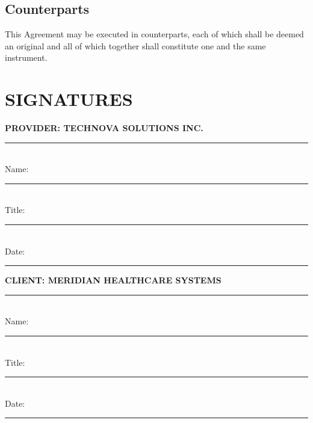 \documentclass[
    language=english,
    doctype=contract,
    institution=none,
]{../../omnilatex}
\begin{document}
\subsection{Counterparts}
This Agreement may be executed in counterparts, each of which shall be deemed an original and all of which together shall constitute one and the same instrument.

\section*{SIGNATURES}

\vspace{2cm}

\noindent\textbf{PROVIDER: TECHNOVA SOLUTIONS INC.}

\vspace{1cm}

\noindent\rule{5cm}{0.4pt} \\
Name: \rule{4cm}{0.4pt} \\
Title: \rule{4cm}{0.4pt} \\
Date: \rule{4cm}{0.4pt}

\vspace{2cm}

\noindent\textbf{CLIENT: MERIDIAN HEALTHCARE SYSTEMS}

\vspace{1cm}

\noindent\rule{5cm}{0.4pt} \\
Name: \rule{4cm}{0.4pt} \\
Title: \rule{4cm}{0.4pt} \\
Date: \rule{4cm}{0.4pt}
\end{document}
